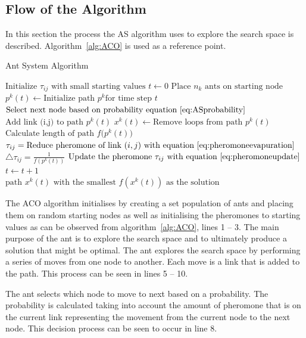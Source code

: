 \subsection{Flow of the Algorithm}
In this section the process the \gls{AS} algorithm uses to explore the search space is described. Algorithm~\ref{alg:ACO} is used as a reference point.
\begin{algorithm}[H]
\caption{Ant System Algorithm~\cite{CompuIntelligenceIntro}}
\label{alg:ACO}
	\begin{algorithmic}[1]
	\State$\text{Initialize $\tau_{ij}$ with small starting values}$
	\State$t \leftarrow 0$
	\State$\text{Place $n_k$ ants on starting node}$
			\State$p^k(t) \leftarrow \text{Initialize path } p^k \text{for time step } t$
			\Repeat
				\State$\text{Select next node based on probability equation~\ref{eq:ASprobability}}$
				\State$\text{Add link (i,j) to path } p^k(t)$
			\State$x^k(t) \leftarrow \text{Remove loops from path }p^k(t)$
			\State$\text{Calculate length of path $f(p^k(t)$})$
		\EndFor
			\State$\tau_{ij} = \text{Reduce pheromone of link $(i,j)$ with equation~\ref{eq:pheromoneevapuration}}$
		\EndFor
				\State$\triangle \tau_{ij} = \frac{1}{f(p^k(t))}$
				\State$\text{Update the pheromone $\tau_{ij}$ with equation~\ref{eq:pheromoneupdate}}$
			\EndFor
		\EndFor
		\State$t \leftarrow t + 1$
	\EndWhile\\
	\Return $\text{path $x^k(t)$ with the smallest $f(x^k(t))$ as the solution}$
	\end{algorithmic}
\end{algorithm}

The \gls{ACO} algorithm initialises by creating a set population of ants and placing them on random starting nodes as well as initialising the pheromones to starting values as can be observed from algorithm~\ref{alg:ACO}, lines 1 -- 3. The main purpose of the ant is to explore the search space and to ultimately produce a solution that might be optimal. The ant explores the search space by performing a series of moves from one node to another. Each move is a link that is added to the path. This process can be seen in lines 5 -- 10.

The ant selects which node to move to next based on a probability. The probability is calculated taking into account the amount of pheromone that is on the current link representing the movement from the current node to the next node\cite{CompuIntelligenceIntro,FundamentalSwarm}. This decision process can be seen to occur in line 8.

